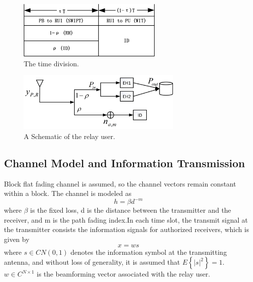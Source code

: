 \documentclass[conference]{IEEEtran}
\begin{document}

\begin{figure}[htbp]
\centerline{\includegraphics[width=7cm,keepaspectratio]{2.png}}
\caption{ The time division.}
\label{fig}
\end{figure}

\begin{figure}[htbp]
\centerline{\includegraphics[width=8cm,keepaspectratio]{3.png}}
\caption{ A Schematic of the relay user.}
\label{fig}
\end{figure}


\subsection{Channel Model and Information Transmission}\label{BB}

Block flat fading channel is assumed, so the channel vectors remain constant within a block. The channel is modeled as
\begin{equation}\label{eqn-1} 
h= \beta d^{-m}
\end{equation}
where $\beta$ is the fixed loss, d is the distance between the transmitter and the receiver, and m is the path fading index.In each time slot, the transmit signal at the transmitter consists the information signals for authorized receivers, which is given by
\begin{equation}\label{eqn-1} 
x=ws
\end{equation}
where $s\in CN\left ( 0,1 \right )$ denotes the information symbol at the transmitting antenna, and without loss of generality, it is assumed that $E\left \{ \left |s  \right |^{2}   \right \} = 1$. $w\in C^{N\times 1}$ is the beamforming vector associated with the  relay user. 
\end{document}
